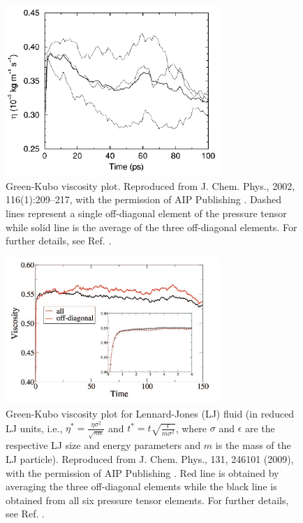 \documentclass[9pt,bestpractices]{livecoms}
\begin{document}
\begin{figure}[htb!]
	\centering
	\includegraphics[width=3.2in]{HessFig5.png}
	\caption{Green-Kubo viscosity plot. Reproduced from J. Chem. Phys., 2002, 116(1):209--217, with the permission of AIP Publishing \cite{Hess2002}. Dashed lines represent a single off-diagonal element of the pressure tensor while solid line is the average of the three off-diagonal elements. For further details, see Ref. \cite{Hess2002}.}
	\label{fig:HessFig5}
\end{figure}

\begin{figure}[htb!]
	\centering
	\includegraphics[width=3.2in]{ChenFig1.png}
	\caption{Green-Kubo viscosity plot for Lennard-Jones (LJ) fluid (in reduced LJ units, i.e., $\eta^* = \frac{\eta \sigma^2}{\sqrt{m \epsilon}}$ and $t^* = t \sqrt{\frac{\epsilon}{m \sigma^2}}$, where $\sigma$ and $\epsilon$ are the respective LJ size and energy parameters and $m$ is the mass of the LJ particle). Reproduced from J. Chem. Phys., 131, 246101 (2009), with the permission of AIP Publishing \cite{Chen2009}. Red line is obtained by averaging the three off-diagonal elements while the black line is obtained from all six pressure tensor elements. For further details, see Ref. \cite{Chen2009}.}
	\label{fig:ChenFig1}
\end{figure}
\end{document}
